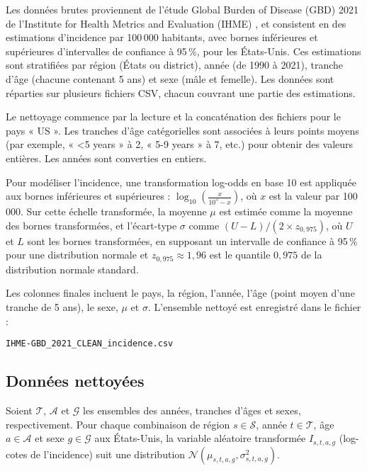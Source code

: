 Les données brutes proviennent de l'étude Global Burden of Disease (GBD) 2021 de l'Institute for Health Metrics and Evaluation (IHME) \citep{IHME2024GBD}, et consistent en des estimations d'incidence par 100\,000 habitants, avec bornes inférieures et supérieures d'intervalles de confiance à 95\,\%, pour les États-Unis. Ces estimations sont stratifiées par région (États ou district), année (de 1990 à 2021), tranche d'âge (chacune contenant 5 ans) et sexe (mâle et femelle). Les données sont réparties sur plusieurs fichiers CSV, chacun couvrant une partie des estimations.

Le nettoyage commence par la lecture et la concaténation des fichiers pour le pays « US ». Les tranches d'âge catégorielles sont associées à leurs points moyens (par exemple, « <5 years » à 2, « 5-9 years » à 7, etc.) pour obtenir des valeurs entières. Les années sont converties en entiers.

Pour modéliser l'incidence, une transformation log-odds en base 10 est appliquée aux bornes inférieures et supérieures : $\log_{10} \left( \frac{x}{10^5 - x} \right)$, où $x$ est la valeur par 100\,000. Sur cette échelle transformée, la moyenne $\mu$ est estimée comme la moyenne des bornes transformées, et l'écart-type $\sigma$ comme $(U - L) / (2 \times z_{0,975})$, où $U$ et $L$ sont les bornes transformées, en supposant un intervalle de confiance à 95\,\% pour une distribution normale et $z_{0,975} \approx 1{,}96$ est le quantile $0,975$ de la distribution normale standard.

Les colonnes finales incluent le pays, la région, l'année, l'âge (point moyen d'une tranche de 5 ans), le sexe, $\mu$ et $\sigma$. L'ensemble nettoyé est enregistré dans le fichier :
\begin{center}
	\texttt{IHME-GBD\_2021\_CLEAN\_incidence.csv}
\end{center}

\subsection{Données nettoyées}

Soient $\mathcal{T}$, $\mathcal{A}$ et $\mathcal{G}$ les ensembles des années, tranches d'âges et sexes, respectivement. Pour chaque combinaison de région $s \in \mathcal{S}$, année $t \in \mathcal{T}$, âge $a \in \mathcal{A}$ et sexe $g \in \mathcal{G}$ aux États-Unis, la variable aléatoire transformée $I_{s,t,a,g}$ (log-cotes de l'incidence) suit une distribution $\mathcal{N}(\mu_{s,t,a,g}, \sigma_{s,t,a,g}^2)$.